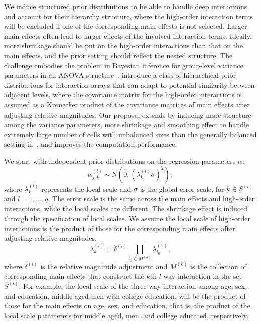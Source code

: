 \documentclass[11pt]{article}
\numberwithin{figure}{section}
\numberwithin{table}{section}
\numberwithin{equation}{section}
\begin{document}
We induce structured prior distributions to be able to handle deep interactions
and account for their hierarchy structure, where the high-order interaction
terms will be excluded if one of the corresponding main effects is not
selected. Larger main effects often lead to larger effects of the involved
interaction terms. Ideally, more shrinkage should be put on the high-order
interactions than that on the main effects, and the prior setting should
reflect the nested structure. The challenge embodies the problem in Bayesian
inference for group-level variance parameters in an ANOVA
structure~\citep{anova:gelman:05, gelman06-prior}. \cite{volfovsky:hoff14}
introduce a class of hierarchical prior distributions for interaction arrays
that can adapt to potential similarity between adjacent levels, where the
covariance matrix for the high-order interactions is assumed as a Kronecker
product of the covariance matrices of main effects after adjusting relative
magnitudes. Our proposal extends by inducing more structure among the variance
parameters, more shrinkage and smoothing effect to handle extremely large
number of cells with unbalanced sizes than the generally balanced setting
in~\cite{volfovsky:hoff14}, and improves the computation performance. 

We start with independent prior distributions on the regression parameters
$\alpha$: \[\alpha_{j,k}^{(l)}\sim \textrm{N}(0, (\lambda_k^{(l)}\sigma)^2),\]
where $\lambda_k^{(l)}$ represents the local scale and $\sigma$ is the global
error scale, for $k\in S^{(l)}$ and $l=1,\dots, q$. The error scale is the same
across the main effects and high-order interactions, while the local scales are
different. The shrinkage effect is induced through the specification of local
scales. We assume the local scale of high-order interactions is the product of
those for the corresponding main effects after adjusting relative magnitudes.
\[\lambda^{(l)}_k=\delta^{(l)}\prod_{l_0\in M^{(k)}}\lambda^{(1)}_{l_0},\]
where $\delta^{(l)}$ is the relative magnitude adjustment and $M^{(k)}$ is the
collection of corresponding main effects that construct the $k$th $l$-way
interaction in the set $S^{(l)}$. For example, the local scale of the three-way
interaction among age, sex, and education, middle-aged men with college
education, will be the product of those for the main effects on age, sex, and
education, that is, the product of the local scale parameters for middle aged,
men, and college educated, respectively. 
\end{document}
